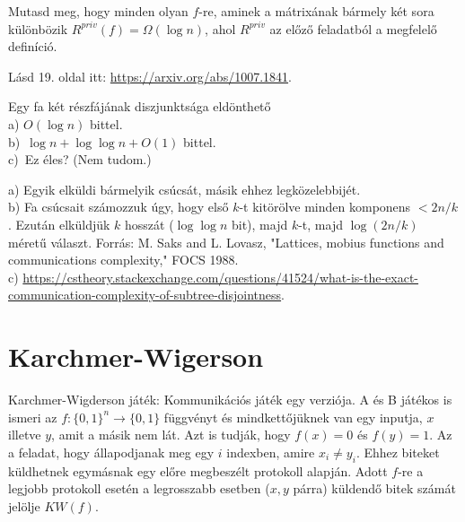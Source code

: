 \begin{Exercise}[counter={sorszam}, difficulty=2]
	Mutasd meg, hogy minden olyan $f$-re, aminek a m\'atrix\'anak b\'armely k\'et sora k\"ul\"onb\"ozik $R^{priv}(f)=\Omega(\log n)$, ahol $R^{priv}$ az el\H oz\H o feladatb\'ol a megfelel\H o defin\'ici\'o.
\end{Exercise}
\begin{Answer}
	L\'asd 19. oldal itt: \url{https://arxiv.org/abs/1007.1841}.%
\end{Answer}


\begin{Exercise}[counter={sorszam}, difficulty=0]
	Egy fa k\'et r\'eszf\'aj\'anak diszjunkts\'aga eld\"onthet\H o\\
	a) $O(\log n)$ bittel.\\
	b)~\hard $\log n +\log\log n+O(1)$ bittel.\\
	c)~\veryhard Ez \'eles? (Nem tudom.)
\end{Exercise}
\begin{Answer}
	a) Egyik elk\"uldi b\'armelyik cs\'ucs\'at, m\'asik ehhez legk\"ozelebbij\'et.\\
	b) Fa cs\'ucsait sz\'amozzuk \'ugy, hogy els\H o $k$-t kit\"or\"olve minden komponens $<2n/k$. Ezut\'an elk\"uldj\"uk $k$ hossz\'at ($\log \log n$ bit), majd $k$-t, majd $\log(2n/k)$ m\'eret\H u v\'alaszt.
	Forr\'as: M. Saks and L. Lovasz,  "Lattices, mobius functions and communications complexity," FOCS 1988.\\
	c) \url{https://cstheory.stackexchange.com/questions/41524/what-is-the-exact-communication-complexity-of-subtree-disjointness}.
\end{Answer}



\section{Karchmer-Wigerson}

 Karchmer-Wigderson j\'at\'ek: Kommunik\'aci\'os j\'at\'ek egy verzi\'oja. A \'es B játékos is ismeri az $f:\{0,1\}^n\rightarrow \{0,1\}$ függvényt \'es mindkett\H oj\"uknek van egy inputja, $x$ illetve $y$, amit a másik nem lát. Azt is tudj\'ak, hogy $f(x)=0$ \'es $f(y)=1$. Az a feladat, hogy állapodjanak meg egy $i$ indexben, amire $x_i\neq y_i$. Ehhez biteket küldhetnek egymásnak egy el\H ore megbeszélt protokoll alapján. Adott $f$-re a legjobb protokoll esetén a legrosszabb esetben ($x,y$ párra) k\"uldend\H o bitek sz\'am\'at jel\"olje $KW(f)$.

